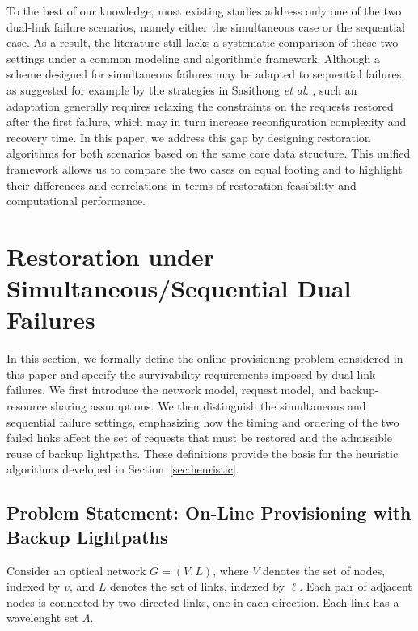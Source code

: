 \documentclass[conference]{IEEEtran}
\def \LinkSet                   {L}
\def \LinkIdx                   {\ell}
\def \NodeSet {V}
\def \NodeIdx {v}
\begin{document}
To the best of our knowledge, most existing studies address only one of the two dual-link failure scenarios, namely either the simultaneous case or the sequential case. As a result, the literature still lacks a systematic comparison of these two settings under a common modeling and algorithmic framework. Although a scheme designed for simultaneous failures may be adapted to sequential failures, as suggested for example by the strategies in Sasithong \textit{et al.} \cite{sasithong2020maximizing}, such an adaptation generally requires relaxing the constraints on the requests restored after the first failure, which may in turn increase reconfiguration complexity and recovery time. In this paper, we address this gap by designing restoration algorithms for both scenarios based on the same core data structure. This unified framework allows us to compare the two cases on equal footing and to highlight their differences and correlations in terms of restoration feasibility and computational performance.
 



\section{Restoration under Simultaneous/Sequential Dual Failures}
\label{sec:restor_sim_seq}

In this section, we formally define the online provisioning problem considered in this paper and specify the survivability requirements imposed by dual-link failures. We first introduce the network model, request model, and backup-resource sharing assumptions. We then distinguish the simultaneous and sequential failure settings, emphasizing how the timing and ordering of the two failed links affect the set of requests that must be restored and the admissible reuse of backup lightpaths. These definitions provide the basis for the heuristic algorithms developed in Section~\ref{sec:heuristic}.



\subsection{Problem Statement: On-Line Provisioning with Backup Lightpaths}
\label{sec:PbStatement}

Consider an optical network $G = (\NodeSet, \LinkSet)$, where $\NodeSet$ denotes the set of nodes, indexed by $\NodeIdx$, and $\LinkSet$ denotes the set of links, indexed by $\LinkIdx$. Each pair of adjacent nodes is connected by two directed links, one in each direction. Each link has a wavelenght set $\Lambda$.
\end{document}
